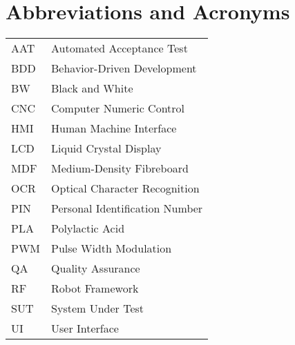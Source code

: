 
\chapter*{Abbreviations and Acronyms}


\noindent
\begin{longtable}{@{}p{}p{}@{}}

AAT & Automated Acceptance Test \\
BDD & Behavior-Driven Development \\
BW & Black and White \\
CNC & Computer Numeric Control \\
HMI & Human Machine Interface \\
LCD & Liquid Crystal Display \\
MDF & Medium-Density Fibreboard \\
OCR & Optical Character Recognition \\
PIN & Personal Identification Number \\
PLA & Polylactic Acid \\
PWM & Pulse Width Modulation \\
QA & Quality Assurance \\
RF & Robot Framework \\
SUT & System Under Test \\
UI & User Interface \\

\end{longtable}
